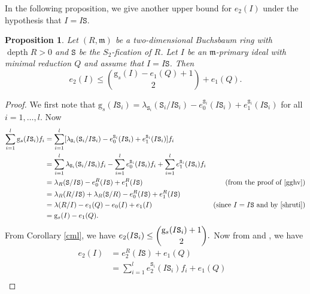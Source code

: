 \documentclass[reqno,a4paper,dvipsnames]{amsart}
\newcommand{\m}{\mathfrak{m} }
\newcommand{\depth}{\operatorname{depth}}
\newtheorem{proposition}[theorem]{Proposition}
\theoremstyle{definition}
\begin{document}
In the following proposition, we  give another upper  bound for $e_{2}(I)$ under the hypothesis that $I=I\mathtt{S}.$
\begin{proposition} \label{dc}
    Let $(R, \m)$ be a two-dimensional Buchsbaum ring with  $\depth R >0$  and $\mathtt{S}$ be the $S_{2}$-fication of $R$. Let $I$ be an $\m$-primary ideal with minimal reduction $Q$ and assume that $I=I\mathtt{S}$. Then
\begin{equation*}
    e_{2}(I) \leq \binom{\mathrm{g}_{s}(I)-e_{1}(Q)+1}{2}+e_{1}(Q) .
    \end{equation*}
  \end{proposition}
\begin{proof}
        We first note that $\mathrm{g}_{s}(I\mathtt{S}_{i})=\lambda_{\mathtt{S}_{i}}(\mathtt{S}_{i}/I\mathtt{S}_{i})-e_{0}^{\mathtt{S}_{i}}(I\mathtt{S}_{i})+e_{1}^{\mathtt{S}_{i}}(I\mathtt{S}_{i})$ for all $i=1,\ldots,l.$ Now
    \begin{align} \nonumber
      \sum_{i=1}^{l}\mathrm{g}_{s}(I\mathtt{S}_{i})f_{i} 
 & =\sum_{i=1}^{l}[\lambda_{\mathtt{S}_{i}}(\mathtt{S}_{i}/I\mathtt{S}_{i})
                           -e_{0}^{\mathtt{S}_{i}}(I\mathtt{S}_{i})+e_{1}^{\mathtt{S}_{i}}(I\mathtt{S}_{i})]f_{i} & \\ \nonumber
 & = \sum_{i=1}^{l}\lambda_{\mathtt{S}_{i}}(\mathtt{S}_{i}/I\mathtt{S}_{i})f_{i}-\displaystyle \sum_{i=1}^{l}e_{0}^{\mathtt{S}_{i}}(I\mathtt{S}_{i})f_{i}
 +    \sum_{i=1}^{l}e_{1}^{\mathtt{S}_{i}}(I\mathtt{S}_{i})f_{i} &  \\ \nonumber
 & = \lambda_{R}(\mathtt{S}/I\mathtt{S})-e_{0}^{R}(I\mathtt{S})+e_{1}^{R}(I\mathtt{S}) & \text{ (from the proof of \cite[Theorem 4.3]{gghv})}\\ \nonumber
& =\lambda_{R}(R/I\mathtt{S})+\lambda_{R}(\mathtt{S}/R)-e_{0}^{R}(I\mathtt{S})+e_{1}^{R}(I\mathtt{S}) &\\ \nonumber
&=\lambda(R/I)-e_{1}(Q)-e_{0}(I)+e_{1}(I) &\text{(since $I=I\mathtt{S}$ and by  \cite[Lemma 4.4]{shruti})}\\ \label{dcx}
 &=\mathrm{g}_{s}(I)-e_{1}(Q). 
    \end{align}
From Corollary \ref{cml}, we have $e_{2}(I\mathtt{S}_{i}) \leq \dbinom{\mathrm{g}_{s}(I\mathtt{S}_{i})+1}{2}.$ Now from \cite[Lemma 4.2 (iii)]{shruti} and \cite[Lemma 4.4]{shruti}, we have
    \begin{align*} 
      e_{2}(I)
 & = e_{2}^{R}(I\mathtt{S})+e_{1}(Q) & \\\nonumber
 &=\displaystyle \sum_{i=1}^{l}e_{2}^{\mathtt{S}_{i}}(I\mathtt{S}_{i})f_{i}+e_{1}(Q) & \\ \nonumber

\end{align*}
\end{proof}
\end{document}
